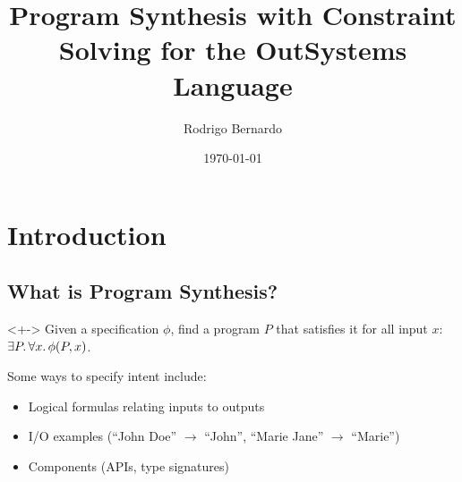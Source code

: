 \documentclass[notes=hide]{beamer}
\title{Program Synthesis with Constraint Solving for the OutSystems Language}
\author{Rodrigo Bernardo}
\institute[]{Instituto Superior Técnico \and OutSystems \and INESC-ID}
\date{\today}
\begin{document}
\begin{frame}
  \titlepage{}
\end{frame}

\section{Introduction} %

\subsection{What is Program Synthesis?} %
\begin{frame}{\secname}{\subsecname}
  \begin{definition}<+->
    Given a specification $\phi{}$, find a program $P$ that satisfies it for all
    input $x$: $\exists{P} \ldotp \forall{x} \ldotp \phi{}(P, x)$.
  \end{definition}

  Some ways to specify intent include:
  \begin{itemize}
  \item Logical formulas relating inputs to outputs
  \item I/O examples (``John Doe'' $\rightarrow$ ``John'', ``Marie Jane'' $\rightarrow$ ``Marie'')
  \item Components (APIs, type signatures)
  \end{itemize}
\end{frame}
\end{document}
